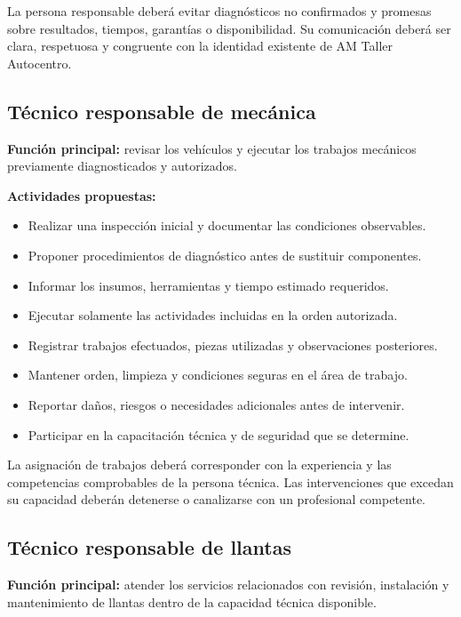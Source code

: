\documentclass[12pt,letterpaper,oneside]{article}
\begin{document}
La persona responsable deberá evitar diagnósticos no confirmados y promesas sobre resultados, tiempos, garantías o disponibilidad. Su comunicación deberá ser clara, respetuosa y congruente con la identidad existente de AM Taller Autocentro.

\subsection{Técnico responsable de mecánica}

\textbf{Función principal:} revisar los vehículos y ejecutar los trabajos mecánicos previamente diagnosticados y autorizados.

\textbf{Actividades propuestas:}
\begin{itemize}
    \item Realizar una inspección inicial y documentar las condiciones observables.
    \item Proponer procedimientos de diagnóstico antes de sustituir componentes.
    \item Informar los insumos, herramientas y tiempo estimado requeridos.
    \item Ejecutar solamente las actividades incluidas en la orden autorizada.
    \item Registrar trabajos efectuados, piezas utilizadas y observaciones posteriores.
    \item Mantener orden, limpieza y condiciones seguras en el área de trabajo.
    \item Reportar daños, riesgos o necesidades adicionales antes de intervenir.
    \item Participar en la capacitación técnica y de seguridad que se determine.
\end{itemize}

La asignación de trabajos deberá corresponder con la experiencia y las competencias comprobables de la persona técnica. Las intervenciones que excedan su capacidad deberán detenerse o canalizarse con un profesional competente.

\subsection{Técnico responsable de llantas}

\textbf{Función principal:} atender los servicios relacionados con revisión, instalación y mantenimiento de llantas dentro de la capacidad técnica disponible.
\end{document}
